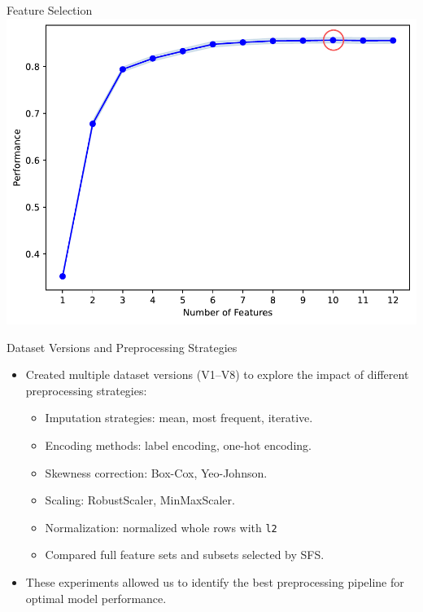 \documentclass{beamer}
\begin{document}
\begin{frame}{Feature Selection}
        \includegraphics[width=\linewidth]{sfs.pdf}
\end{frame}

\begin{frame}{Dataset Versions and Preprocessing Strategies}
        \begin{itemize}
                \item Created multiple dataset versions (V1–V8) to explore the
                        impact of different preprocessing strategies:
                        \begin{itemize}
                                \item Imputation strategies: mean, most
                                        frequent, iterative.
                                \item Encoding methods: label encoding, one-hot
                                        encoding.
                                \item Skewness correction: Box-Cox,
                                        Yeo-Johnson.
                                \item Scaling: RobustScaler, MinMaxScaler.
                                \item Normalization: normalized whole rows with
                                        \texttt{l2}
                                \item Compared full feature sets and subsets
                                        selected by SFS.
                        \end{itemize}
                \item These experiments allowed us to identify the best
                        preprocessing pipeline for optimal model performance.
        \end{itemize}
\end{frame}
\end{document}
